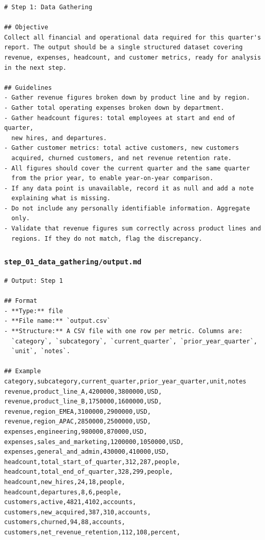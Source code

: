 \documentclass[12pt, a4paper]{article}
\begin{document}
\begin{lstlisting}[language={}]
# Step 1: Data Gathering

## Objective
Collect all financial and operational data required for this quarter's
report. The output should be a single structured dataset covering
revenue, expenses, headcount, and customer metrics, ready for analysis
in the next step.

## Guidelines
- Gather revenue figures broken down by product line and by region.
- Gather total operating expenses broken down by department.
- Gather headcount figures: total employees at start and end of quarter,
  new hires, and departures.
- Gather customer metrics: total active customers, new customers
  acquired, churned customers, and net revenue retention rate.
- All figures should cover the current quarter and the same quarter
  from the prior year, to enable year-on-year comparison.
- If any data point is unavailable, record it as null and add a note
  explaining what is missing.
- Do not include any personally identifiable information. Aggregate
  only.
- Validate that revenue figures sum correctly across product lines and
  regions. If they do not match, flag the discrepancy.
\end{lstlisting}

\subsubsection{\texttt{step\_01\_data\_gathering/output.md}}

\begin{lstlisting}[language={}]
# Output: Step 1

## Format
- **Type:** file
- **File name:** `output.csv`
- **Structure:** A CSV file with one row per metric. Columns are:
  `category`, `subcategory`, `current_quarter`, `prior_year_quarter`,
  `unit`, `notes`.

## Example
category,subcategory,current_quarter,prior_year_quarter,unit,notes
revenue,product_line_A,4200000,3800000,USD,
revenue,product_line_B,1750000,1600000,USD,
revenue,region_EMEA,3100000,2900000,USD,
revenue,region_APAC,2850000,2500000,USD,
expenses,engineering,980000,870000,USD,
expenses,sales_and_marketing,1200000,1050000,USD,
expenses,general_and_admin,430000,410000,USD,
headcount,total_start_of_quarter,312,287,people,
headcount,total_end_of_quarter,328,299,people,
headcount,new_hires,24,18,people,
headcount,departures,8,6,people,
customers,active,4821,4102,accounts,
customers,new_acquired,387,310,accounts,
customers,churned,94,88,accounts,
customers,net_revenue_retention,112,108,percent,
\end{lstlisting}
\end{document}
